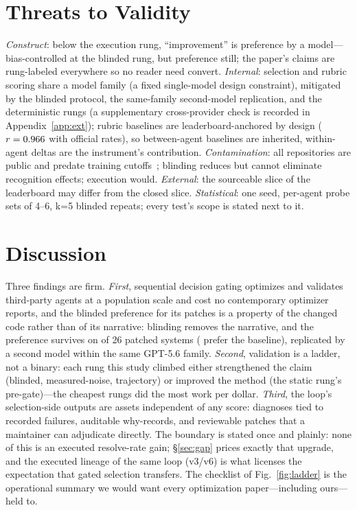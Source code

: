 \documentclass[11pt]{article}
\begin{document}
\section{Threats to Validity}
\label{sec:threats}
\emph{Construct}: below the execution rung, ``improvement'' is preference by
a model---bias-controlled at the blinded rung, but preference still; the
paper's claims are rung-labeled everywhere so no reader need convert.
\emph{Internal}: selection and rubric scoring share a model family (a fixed
single-model design constraint), mitigated by the blinded protocol, the
same-family second-model replication, and the deterministic rungs (a
supplementary cross-provider check is recorded in Appendix~\ref{app:ext});
rubric baselines are
leaderboard-anchored by design ($r=0.966$ with official rates), so
between-agent baselines are inherited, within-agent deltas are the
instrument's contribution. \emph{Contamination}: all repositories are public
and predate training cutoffs~\citep{contamination2023}; blinding reduces but
cannot eliminate recognition effects; execution would. \emph{External}: the
sourceable slice of the leaderboard may differ from the closed slice.
\emph{Statistical}: one seed, per-agent probe sets of 4--6, k=5 blinded
repeats; every test's scope is stated next to it.

\section{Discussion}
\label{sec:discussion}
Three findings are firm. \emph{First}, sequential decision gating optimizes
and validates third-party agents at a population scale and cost no
contemporary optimizer reports,
and the blinded preference for its patches is a property of the changed
code rather than of its narrative: blinding removes the
narrative, and the preference survives on \swBlindMajP{} of 26 patched systems
(\swBlindMajB{} prefer the baseline), replicated by a second
model within the same GPT-5.6 family. \emph{Second}, validation is a ladder, not a binary:
each rung this study climbed either strengthened the claim (blinded,
measured-noise, trajectory) or improved the method (the static rung's
pre-gate)---the cheapest rungs did the most work per dollar. \emph{Third},
the loop's selection-side outputs are assets independent of any score:
diagnoses tied to recorded failures, \swVersions{} auditable why-records, and
\swApplied{} reviewable patches that a maintainer can adjudicate directly.
The boundary is stated once and plainly: none of this is an executed
resolve-rate gain; \S\ref{sec:gap} prices exactly that upgrade, and the
executed lineage of the same loop (v3/v6) is what licenses the expectation
that gated selection transfers. The checklist of Fig.~\ref{fig:ladder} is the
operational summary we would want every optimization paper---including
ours---held to.
\end{document}
